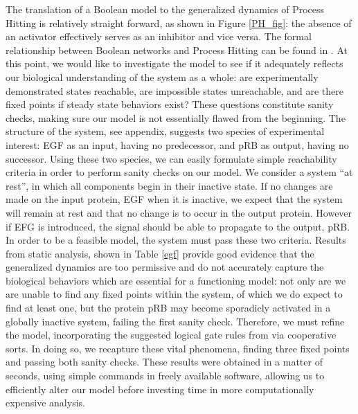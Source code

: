 \documentclass{article}
\begin{document}
The translation of a Boolean model to the generalized dynamics of Process Hitting is relatively straight forward, as shown in Figure \ref{PH_fig}: the absence of an activator effectively serves as an inhibitor and vice versa. The formal relationship between Boolean networks and Process Hitting can be found in \cite{FPIMR12-CMSB}. At this point, we would like to investigate the model to see if it adequately reflects our biological understanding of the system as a whole: are experimentally demonstrated states reachable, are impossible states unreachable, and are there fixed points if steady state behaviors exist? These questions constitute sanity checks, making sure our model is not essentially flawed from the beginning. The structure of the system, see appendix, suggests two species of experimental interest: EGF as an input, having no predecessor, and pRB as output, having no successor. Using these two species, we can easily formulate simple reachability criteria in order to perform sanity checks on our model. We consider a system ``at rest'', in which all components begin in their inactive state. If no changes are made on the input protein, EGF when it is inactive, we expect that the system will remain at rest and that no change is to occur in the output protein. However if EFG is introduced, the signal should be able to propagate to the output, pRB. In order to be a feasible model, the system must pass these two criteria. Results from static analysis, shown in Table \ref{egf} provide good evidence that the generalized dynamics are too permissive and do not accurately capture the biological behaviors which are essential for a functioning model: not only are we are unable to find any fixed points within the system, of which we do expect to find at least one, but the protein pRB may become sporadicly activated in a globally inactive system, failing the first sanity check. Therefore, we must refine the model, incorporating the suggested logical gate rules from \cite{Sahin09} via cooperative sorts. In doing so, we recapture these vital phenomena, finding three fixed points and passing both sanity checks. These results were obtained in a matter of seconds, using simple commands in freely available software, allowing us to efficiently alter our model before investing time in more computationally expensive analysis.
\end{document}
